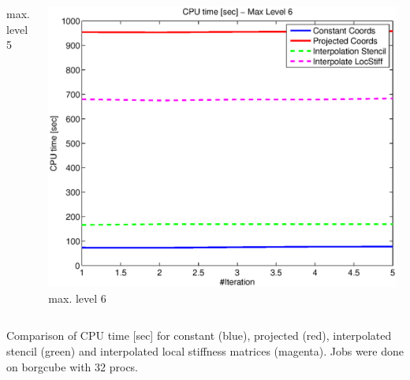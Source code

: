 \documentclass[t,compress=false,usepdftitle=false]{beamer}
\begin{document}
\begin{frame}
\begin{columns}[T]
\begin{column}[T]{4.3cm}
  max. level 5
\end{column}\hfill
\begin{column}[T]{4.3cm} 
  \centering
  \includegraphics[width=0.98\textwidth]{spherestokes_cpuTime_level6}\\
  max. level 6
\end{column}
\end{columns}
\vspace{0.5cm}
\centering
Comparison of CPU time [sec] for constant (blue), projected (red), interpolated
stencil (green) and interpolated local stiffness matrices (magenta).
Jobs were done on borgcube with 32 procs.
\end{frame}
\end{document}
